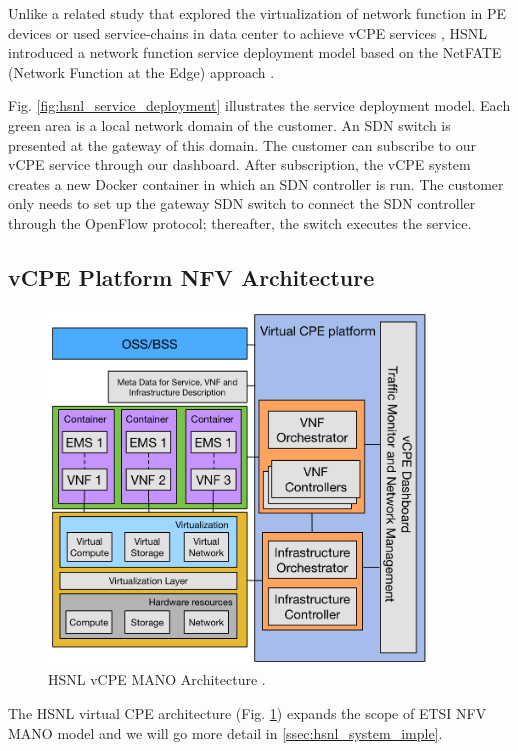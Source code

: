Unlike a related study that explored the virtualization of network function in PE devices \cite{vcpe-enhance} or used service-chains in data center to achieve vCPE services \cite{ericsson-vcpe}, HSNL introduced a network function service deployment model based on the NetFATE (Network Function at the Edge) approach \cite{netfate}.

Fig. \ref{fig:hsnl_service_deployment} illustrates the service deployment model. Each green area is a local network domain of the customer. An SDN switch is presented at the gateway of this domain. The customer can subscribe to our vCPE service through our dashboard. After subscription, the vCPE system creates a new Docker container in which an SDN controller is run. The customer only needs to set up the gateway SDN switch to connect the SDN controller through the OpenFlow protocol; thereafter, the switch executes the service.


\subsection{vCPE Platform NFV Architecture}

\begin{figure}[!t]
\centering
\includegraphics[width=0.9\textwidth]{./fig/hsnl_vcpe_architecture}
\caption{HSNL vCPE MANO Architecture \cite{che-wei-master}.}
\label{fig:hsnl_vcpe_architecture}
\end{figure}

The HSNL virtual CPE architecture (Fig. \ref{fig:hsnl_vcpe_architecture}) expands the scope of ETSI NFV MANO model and we will go more detail in \ref{ssec:hsnl_system_imple}.


